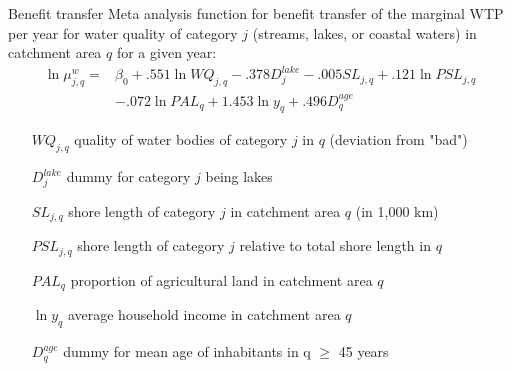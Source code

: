\begin{frame}{Benefit transfer}
  Meta analysis function for benefit transfer of the marginal WTP per year for water quality of category $j$ (streams, lakes, or coastal waters) in catchment area $q$ for a given year:
  \begin{align*}
    \ln \mu_{j,q}^{w}=&\beta_0+.551\ln WQ_{j,q}-.378D_{j}^{lake}-.005SL_{j,q}+.121\ln PSL_{j,q}\\
                        &-.072\ln PAL_q+1.453\ln y_q+.496D_q^{age}
  \end{align*}
  \begin{itemize}
    \item[$WQ_{j,q}$] quality of water bodies of category $j$ in $q$ (deviation from "bad")
    \item[$D_{j}^{lake}$] dummy for category $j$ being lakes
    \item[$SL_{j,q}$] shore length of category $j$ in catchment area $q$ (in 1,000 km)
    \item[$PSL_{j,q}$] shore length of category $j$ relative to total shore length in $q$
    \item[$PAL_q$] proportion of agricultural land in catchment area $q$
    \item[$\ln y_q$] average household income in catchment area $q$
    \item[$D_q^{age}$] dummy for mean age of inhabitants in q $\geq$ 45 years
  \end{itemize}
\end{frame}